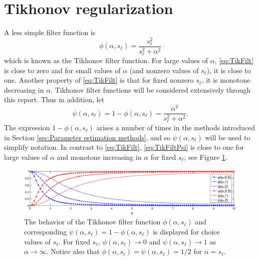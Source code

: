 \documentclass[12pt]{book}
\newcommand{\regparam}{\alpha}
\newcommand{\filt}{\phi}
\newcommand{\mfilt}{\psi}
\newcommand{\singular}{s}	%
\begin{document}
\section{Tikhonov regularization} \label{sec:Tikhonov reg.}

A less simple filter function is
\begin{equation}
\filt(\regparam,\singular_\ell)  = \frac{\singular_\ell^2}{\singular_\ell^2 + \regparam^2}
\label{eq:TikFilt}
\end{equation}
which is known as the Tikhonov filter function. For large values of $\regparam$, \eqref{eq:TikFilt} is close to zero and for small values of $\regparam$ (and nonzero values of $\singular_\ell$), it is close to one. Another property of \eqref{eq:TikFilt} is that for fixed nonzero $\singular_\ell$, it is monotone decreasing in $\regparam$. Tikhonov filter functions will be considered extensively through this report. Thus in addition, let
\begin{equation}
\mfilt(\regparam,\singular_\ell) = 1 - \filt(\regparam,\singular_\ell) = \frac{\regparam^2}{\singular_\ell^2 + \regparam^2}.
\label{eq:TikFiltPsi}
\end{equation}
The expression $1 - \filt(\regparam,\singular_\ell)$ arises a number of times in the methods introduced in Section \ref{sec:Parameter estimation methods}, and so $\mfilt(\regparam,\singular_\ell)$ will be used to simplify notation. In contrast to \eqref{eq:TikFilt}, \eqref{eq:TikFiltPsi} is close to one for large values of $\regparam$ and monotone increasing in $\regparam$ for fixed $\singular_\ell$; see Figure \ref{fig:Phi Psi Plot}. \par 

\begin{figure}
	\centerline{\includegraphics[scale = 0.4]{Figures/Phi_Psi_Plot.eps}}
\caption{The behavior of the Tikhonov filter function $\filt(\regparam,\singular_\ell)$ and corresponding $\mfilt(\regparam,\singular_\ell) = 1 - \filt(\regparam,\singular_\ell)$ is displayed for choice values of $\singular_\ell$. For fixed $\singular_\ell$, $\filt(\regparam,\singular_\ell) \rightarrow 0$ and $\mfilt(\regparam,\singular_\ell) \rightarrow 1$ as $\regparam \rightarrow \infty$. Notice also that $\filt(\regparam,\singular_\ell) = \mfilt(\regparam,\singular_\ell) = 1/2$ for $\alpha = \singular_\ell$.}
\label{fig:Phi Psi Plot}
\end{figure}
\end{document}
